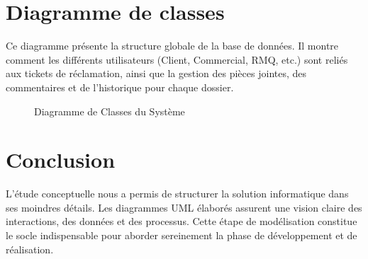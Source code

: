 \section{Diagramme de classes}
Ce diagramme présente la structure globale de la base de données. Il montre comment les différents utilisateurs (Client, Commercial, RMQ, etc.) sont reliés aux tickets de réclamation, ainsi que la gestion des pièces jointes, des commentaires et de l'historique pour chaque dossier.

\begin{figure}[H]
    \centering
    \caption{Diagramme de Classes du Système}
    \label{fig:diag-classes}
\end{figure}

\section*{Conclusion}
L'étude conceptuelle nous a permis de structurer la solution informatique dans ses moindres détails. Les diagrammes UML élaborés assurent une vision claire des interactions, des données et des processus. Cette étape de modélisation constitue le socle indispensable pour aborder sereinement la phase de développement et de réalisation.
